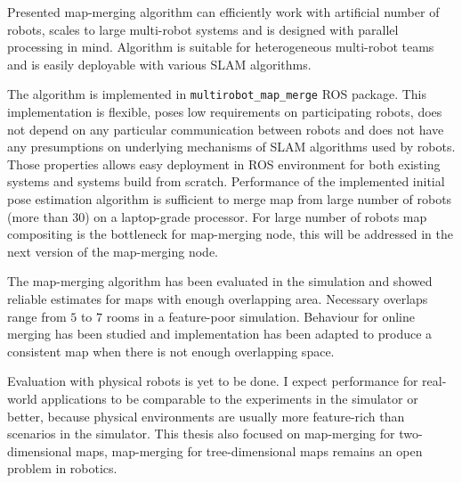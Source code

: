 
Presented map-merging algorithm can efficiently work with artificial number of robots, scales to large multi-robot systems and is designed with parallel processing in mind. Algorithm is suitable for heterogeneous multi-robot teams and is easily deployable with various \gls{SLAM} algorithms.

The algorithm is implemented in \texttt{multirobot\_map\_merge} \gls{ROS} package. This implementation is flexible, poses low requirements on participating robots, does not depend on any particular communication between robots and does not have any presumptions on underlying mechanisms of \gls{SLAM} algorithms used by robots. Those properties allows easy deployment in \gls{ROS} environment for both existing systems and systems build from scratch. Performance of the implemented initial pose estimation algorithm is sufficient to merge map from large number of robots (more than $30$) on a laptop-grade processor. For large number of robots map compositing is the bottleneck for map-merging node, this will be addressed in the next version of the map-merging node.

The map-merging algorithm has been evaluated in the simulation and showed reliable estimates for maps with enough overlapping area. Necessary overlaps range from $5$ to $7$ rooms in a feature-poor simulation. Behaviour for online merging has been studied and implementation has been adapted to produce a consistent map when there is not enough overlapping space.

Evaluation with physical robots is yet to be done. I expect performance for real-world applications to be comparable to the experiments in the simulator or better, because physical environments are usually more feature-rich than scenarios in the simulator. This thesis also focused on map-merging for two-dimensional maps, map-merging for tree-dimensional maps remains an open problem in robotics.
